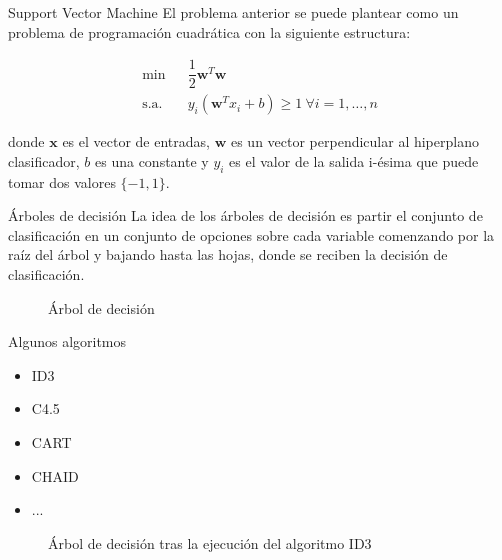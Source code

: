 \documentclass[hyperref={unicode}]{beamer}
\begin{document}
\begin{frame}{Support Vector Machine}
	El problema anterior se puede plantear como un problema de programación cuadrática con la siguiente estructura:
	
	\begin{align}
	 \min & \ \ \ \dfrac{1}{2}\mathbf{w}^T \mathbf{w}\\
	 \text{s.a. } & \ \ \ y_i (\mathbf{w}^T x_i + b) \geq 1 \ \forall i = 1,\dots, n
	 \end{align}
	 
	 donde $\mathbf{x}$ es el vector de entradas, $\mathbf{w}$ es un vector perpendicular al hiperplano clasificador, $b$ es una constante y $y_i$ es el valor de la salida i-ésima que puede  tomar dos valores $\{-1,1\}$. 
	 
\end{frame}

\begin{frame}{Árboles de decisión}
	La idea de los árboles de decisión es partir el conjunto de clasificación en un conjunto de opciones sobre cada variable comenzando por la raíz del árbol y bajando hasta las hojas, donde se reciben la decisión de clasificación.
	
	\begin{figure}[htbp!]
		\centering
			\resizebox{!}{0.3\textwidth}{\arboldedecision}
		\caption{Árbol de decisión}
		\label{fig:arboldecision}
	\end{figure}
\end{frame}

\begin{frame}{Algunos algoritmos}
	\begin{minipage}{0.2\textwidth}
	\begin{itemize}
		\item ID3
		\item C4.5
		\item CART
		\item CHAID
		\item ...
		\end{itemize}
	\end{minipage}
	\hfill
	\begin{minipage}{0.7\textwidth}
		\begin{figure}[htbp!]
				\centering
				
				\resizebox{!}{0.5\textwidth}{\ejemploarboldecision}
				\caption{Árbol de decisión tras la ejecución del algoritmo ID3}
				\label{fig:arboldecisionejemplo}
			\end{figure}
	\end{minipage}
\end{frame}
\end{document}
